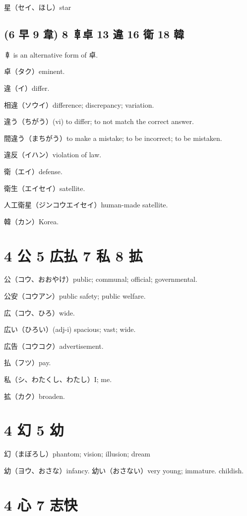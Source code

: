 星（セイ、ほし）star

\subsection{(6 早 9 韋) 8 𠦝卓 13 違 16 衛 18 韓}

𠦝 is an alternative form of 卓.

卓（タク）eminent.

違（イ）differ.

相違（ソウイ）difference; discrepancy; variation.

違う（ちがう）(vi) to differ; to not match the correct answer.

間違う（まちがう）to make a mistake; to be incorrect; to be mistaken.

違反（イハン）violation of law.

衛（エイ）defense.

衛生（エイセイ）satellite.

人工衛星（ジンコウエイセイ）human-made satellite.

韓（カン）Korea.

\section{4 公 5 広払 7 私 8 拡}

公（コウ、おおやけ）public; communal; official; governmental.

公安（コウアン）public safety; public welfare.

広（コウ、ひろ）wide.

広い（ひろい）(adj-i) spacious; vast; wide.

広告（コウコク）advertisement.

払（フツ）pay.

私（シ、わたくし、わたし）I; me.

拡（カク）broaden.

\section{4 幻 5 幼}

幻（まぼろし）phantom; vision; illusion; dream

幼（ヨウ、おさな）infancy.
幼い（おさない）very young; immature. childish.

\section{4 心 7 志快}


